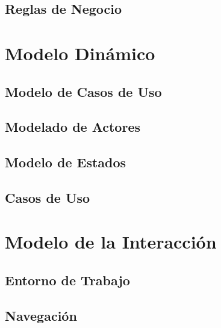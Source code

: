 \documentclass[10pt]{book}
\begin{document}
	
	\chapter{Reglas de Negocio} %
	\label{chapter:rn}
	

	
	\part{Modelo Dinámico}
	
	
	\chapter{Modelo de Casos de Uso} %
	\label{chapter:UC}
	
	
	
	\chapter{Modelado de Actores}
	\label{chapter:actores}
		
	
	\chapter{Modelo de Estados} %
	\label{chapter:edos}
	
	\chapter{Casos de Uso}
	
	
	\part{Modelo de la Interacción}
	
	
	
	\chapter{Entorno de Trabajo}
	\label{chapter:entornoTrabajo}
	
	
	\chapter{Navegación}
	\label{chapter:navegacion}
	
\end{document}
